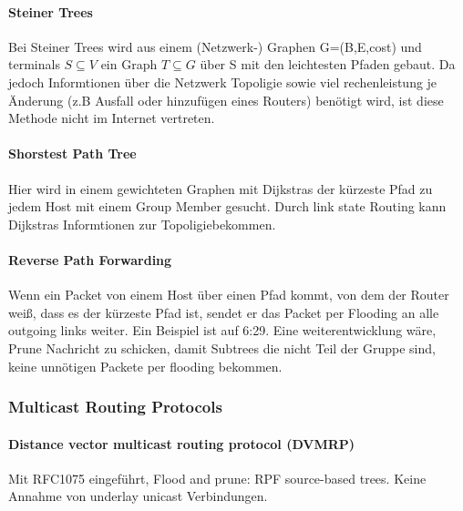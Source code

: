             \paragraph{Steiner Trees}
                Bei Steiner Trees wird aus einem (Netzwerk-) Graphen G=(B,E,cost) und terminals $S\subseteq V$ ein Graph $T\subseteq G$ über S mit den leichtesten Pfaden gebaut. Da jedoch Informtionen über die Netzwerk Topoligie sowie viel rechenleistung je Änderung (z.B Ausfall oder hinzufügen eines Routers) benötigt wird, ist diese Methode nicht im Internet vertreten. 
            
            \paragraph{Shorstest Path Tree}
                Hier wird in einem gewichteten Graphen mit Dijkstras der kürzeste Pfad zu jedem Host mit einem Group Member gesucht. Durch link state Routing kann Dijkstras Informtionen zur Topoligiebekommen. 

            \paragraph{Reverse Path Forwarding}
                Wenn ein Packet von einem Host über einen Pfad kommt, von dem der Router weiß, dass es der kürzeste Pfad ist, sendet er das Packet per Flooding an alle outgoing links weiter. Ein Beispiel ist auf 6:29. Eine weiterentwicklung wäre, Prune Nachricht zu schicken, damit Subtrees die nicht Teil der Gruppe sind, keine unnötigen Packete per flooding bekommen.

        \subsubsection{Multicast Routing Protocols}
            \paragraph{Distance vector multicast routing protocol (DVMRP)}
                Mit RFC1075 eingeführt, Flood and prune: RPF source-based trees. Keine Annahme von underlay unicast Verbindungen. 
            
